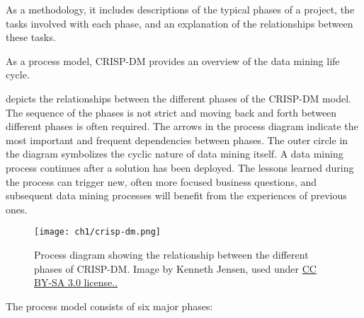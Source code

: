 As a methodology, it includes descriptions of the typical phases of a project, the tasks involved with each phase, and an explanation of the relationships between these tasks.

As a process model, CRISP-DM provides an overview of the data mining life cycle.

 depicts the relationships between the different phases of the CRISP-DM model. The sequence of the phases is not strict and moving back and forth between different phases is often required. The arrows in the process diagram indicate the most important and frequent dependencies between phases. The outer circle in the diagram symbolizes the cyclic nature of data mining itself. A data mining process continues after a solution has been deployed. The lessons learned during the process can trigger new, often more focused business questions, and subsequent data mining processes will benefit from the experiences of previous ones.

\begin{figure}[hpt]
	\centering
	\texttt{[image: ch1/crisp-dm.png]}
	\caption{Process diagram showing the relationship between the different phases of CRISP-DM. Image by Kenneth Jensen, used under \href{https://creativecommons.org/licenses/by/2.0/}{CC BY-SA 3.0 license..}}
	\label{fig:crisp-dm}
\end{figure}

The process model consists of six major phases:

